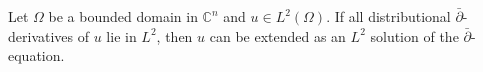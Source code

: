 
Let $\Omega$ be a bounded domain in $\mathbb{C}^n$ and $u \in L^2(\Omega)$. If all distributional $\bar{\partial}$-derivatives of $u$ lie in $L^2$, then $u$ can be extended as an $L^2$ solution of the $\bar{\partial}$-equation.
